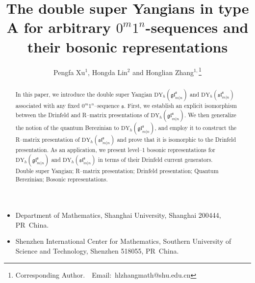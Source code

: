 \documentclass[a4paper,12pt]{article}
\numberwithin{equation}{section}
\begin{document}
\title{The double super Yangians in type A for arbitrary $0^m 1^n$-sequences and their bosonic representations}

\author{ Pengfa Xu${}^1$, Hongda Lin${}^2$ and Honglian Zhang${}^{1,}$\thanks{Corresponding Author.~~Email:~hlzhangmath@shu.edu.cn}}
\maketitle


\begin{center}
\footnotesize
\begin{itemize}
\item[1] Department of Mathematics, Shanghai University, Shanghai 200444, PR~China.
\item[2] Shenzhen International Center for Mathematics, Southern University of Science and Technology, Shenzhen 518055, PR~China.

\end{itemize}
\end{center}
\begin{abstract}
In this paper, we introduce the double super Yangian 
$\mathrm{DY}_{h}(\mathfrak{gl}_{m|n}^{\mathfrak{s}})$ and $\mathrm{DY}_{h}(\mathfrak{sl}_{m|n}^{\mathfrak{s}})$ associated with any fixed $0^{m}1^{n}$--sequence $\mathfrak{s}$. First, we establish an explicit isomorphism between the Drinfeld and R--matrix presentations of $\mathrm{DY}_{h}(\mathfrak{gl}^{\mathfrak{s}}_{m|n})$. We then generalize the notion of the quantum Berezinian to $\mathrm{DY}_{h}(\mathfrak{gl}_{m|n}^{\mathfrak{s}})$, and employ it to construct the R--matrix presentation of $\mathrm{DY}_{h}(\mathfrak{sl}_{m|n}^{\mathfrak{s}})$ and prove that it is isomorphic to the Drinfeld presentation. As an application, we present level--1 bosonic representations for  $\mathrm{DY}_{h}(\mathfrak{gl}_{m|n}^{\mathfrak{s}})$ and $\mathrm{DY}_{h}(\mathfrak{sl}_{m|n}^{\mathfrak{s}})$ in terms of their Drinfeld current generators. \\

Double super Yangian; R--matrix presentation; Drinfeld presentation; Quantum Berezinian; Bosonic representations.
\end{abstract}
\end{document}
